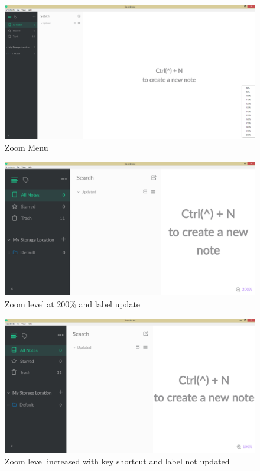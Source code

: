 \documentclass[main.tex]{subfiles}
\begin{document}
\begin{figure}[h]
\includegraphics[scale=0.2]{images/zoomMenu.png}
\centering
\caption{Zoom Menu}
\label{fig:zoommenu}
\end{figure}

\begin{figure}[h]
\includegraphics[scale=0.2]{images/zoomIn.png}
\centering
\caption{Zoom level at 200\% and label update}
\label{fig:zoomupdated} %
\end{figure}

\begin{figure}[h]
\includegraphics[scale=0.2]{images/zoomInUn.png}
\centering
\caption{Zoom level increased with key shortcut and label not updated}
\label{fig:zoomnotupdated} %
\end{figure}
\clearpage
\end{document}
